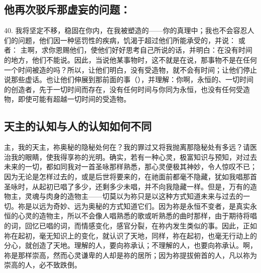 
\subsection{他再次驳斥那虚妄的问题：}

40. 我将坚定不移，稳固在你内，在我被塑造的——你的真理中；我也不会容忍人们的问题，他们因一种惩罚性的疾病，饥渴于超过他们所能承受的，并说： 或者： 主啊，求你恩赐他们，使他们好好思考自己所说的话，并明白：在没有时间的地方，他们不能说。因此，当说他某事物时，这不就是在说，那事物不是在任何一个时间被造的吗？所以，让他们明白，没有受造物，就不会有时间；让他们停止说那些虚话。也让他们伸展到那前面的事（），并理解：你啊，永恒的、一切时间的创造者，先于一切时间而存在，没有任何时间与你同为永恒，也没有任何受造物，即使可能有超越一切时间的受造物。\par


\subsection{天主的认知与人的认知如何不同}

主，我的天主，祢奥秘的隐秘处何在？我的罪过又将我抛离那隐秘处有多远？请医治我的眼睛，使我得享祢的光明。确实，若有一种心灵，极富知识与预知，对过去未来的一切，都如同我对一首圣咏那样熟悉，那心灵便极其神妙，令人惊叹不已；因为无论是怎样过去的，或是后世将要来的，在祂面前都毫不隐藏，犹如我唱那首圣咏时，从起初已唱了多少，还剩多少未唱，并不向我隐藏一样。但是，万有的造物主，灵魂与肉身的造物主——切莫以为祢只是以这种方式知道未来与过去的一切。祢是以远为奇妙、远为奥秘的方式知道它们。因为祢是永恒不变者，是真实永恒的心灵的造物主，所以不会像人唱熟悉的歌或听熟悉的曲时那样，由于期待将唱的词，回忆已唱的词，而情感变化，感官分裂，在祢内发生类似的事。因此，正如祢在起初，毫无知识上的变化，就认识了天地，同样，祢在起初，也毫无行动上的分心，就创造了天地。理解的人，要向祢承认；不理解的人，也要向祢承认。啊，祢是那样崇高，然而心灵谦卑的人却是祢的居所；因为祢提拔俯首的人，凡以祢为崇高的人，必不致跌倒。\par


